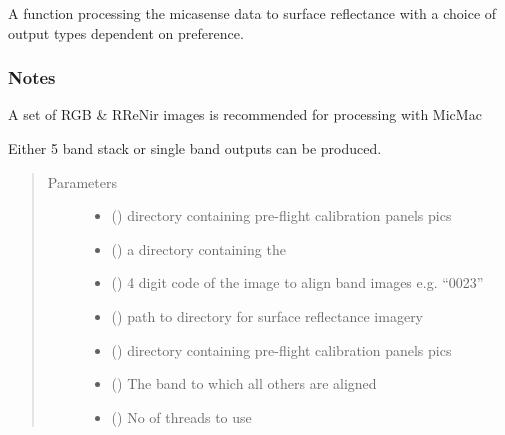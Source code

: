 \documentclass[letterpaper,10pt,english]{sphinxmanual}
\begin{document}

\begin{fulllineitems}
\label{\detokenize{pycmac:mspec.mspec_proc}}
A function processing the micasense data to surface reflectance with a
choice of output types dependent on preference.
\subsubsection*{Notes}

A set of RGB \& RReNir images is recommended for processing with MicMac

Either 5 band stack or single band outputs can be produced.
\begin{quote}\begin{description}
\item[{Parameters}] \leavevmode\begin{itemize}
\item {} 
 () \textendash{} directory containing pre-flight calibration panels pics

\item {} 
 () \textendash{} a directory containing the

\item {} 
 () \textendash{} 4 digit code of the image to align band images
e.g. “0023”

\item {} 
 () \textendash{} path to directory for surface reflectance imagery

\item {} 
 () \textendash{} directory containing pre-flight calibration panels pics

\item {} 
 () \textendash{} The band to which all others are aligned

\item {} 
 () \textendash{} No of threads to use


\end{itemize}
\end{description}
\end{quote}
\end{fulllineitems}
\end{document}
